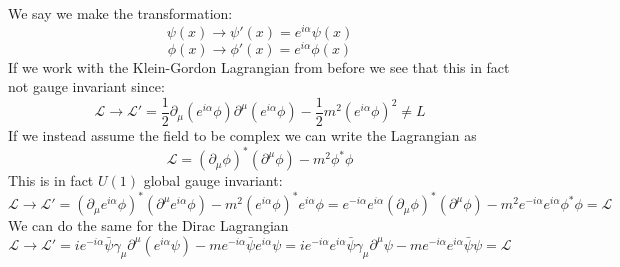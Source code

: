 \documentclass[a4,10pt,titlepage]{article}
\renewcommand\[{\begin{equation*}}
\renewcommand\]{\end{equation*}}
\numberwithin{equation}{section}
\newcommand{\lp}{\left}
\newcommand{\rp}{\right}
\newcommand{\Lar}{\mathscr{L}}
\newcommand{\half}{\frac{1}{2}}
\begin{document}
We say we make the transformation:
\[
\psi(x)\rightarrow  \psi'(x)=e^{i\alpha}\psi(x)
\]
\[
\phi(x)\rightarrow  \phi'(x)=e^{i\alpha}\phi(x)
\]
If we work with the Klein-Gordon Lagrangian from before we see that this in fact not gauge invariant since:
\[
\Lar\rightarrow\Lar'=\half\partial_\mu\lp(e^{i\alpha}\phi\rp) \partial^\mu\lp(e^{i\alpha}\phi\rp)-\half m^2\lp(e^{i\alpha}\phi\rp)^2\neq L
\]
If we instead assume the field to be complex we can write the Lagrangian as 
\[
\Lar=\lp(\partial_\mu \phi\rp)^* \lp(\partial^\mu \phi\rp) - m^2\phi^*\phi
\]
This is in fact $U(1)$ global gauge invariant:
\[
\Lar\rightarrow\Lar'=\lp(\partial_\mu e^{i\alpha}\phi\rp)^* \lp(\partial^\mu e^{i\alpha}\phi\rp) - m^2\lp(e^{i\alpha}\phi\rp)^*e^{i\alpha}\phi=e^{-i\alpha}e^{i\alpha}\lp(\partial_\mu \phi\rp)^* \lp(\partial^\mu \phi\rp)- m^2e^{-i\alpha}e^{i\alpha}\phi^*\phi=\Lar
\]
We can do the same for the Dirac Lagrangian
\[
\Lar\rightarrow\Lar'=ie^{-i\alpha}\bar\psi\gamma_\mu\partial^\mu\lp(e^{i\alpha}\psi\rp)-me^{-i\alpha}\bar\psi e^{i\alpha}\psi=
ie^{-i\alpha}e^{i\alpha}\bar\psi\gamma_\mu\partial^\mu\psi-me^{-i\alpha}e^{i\alpha}\bar\psi \psi=\Lar
\]
\end{document}
